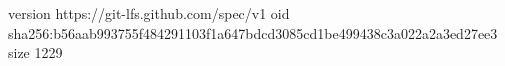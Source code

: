 version https://git-lfs.github.com/spec/v1
oid sha256:b56aab993755f484291103f1a647bdcd3085cd1be499438c3a022a2a3ed27ee3
size 1229

